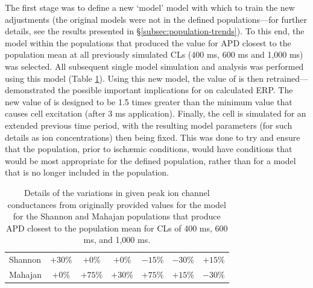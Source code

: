\documentclass[../thesis-main.tex]{subfiles}
\begin{document}
The first stage was to define a new `model' model with which to train the new adjustments (the original models were not in the defined populations---for further details, see the results presented in \S\ref{subsec:population-trends}). To this end, the model within the populations that produced the value for APD closest to the population mean at all previously simulated CLs (400 ms, 600 ms and 1,000 ms) was selected. All subsequent single model simulation and analysis was performed using this model (Table \ref{table:isch-model}). Using this new model, the value of \istim{} is then retrained---\citet{Sutton2000} demonstrated the possible important implications for \istim{} on calculated ERP. The new value of \istim{} is designed to be 1.5 times greater than the minimum value that causes cell excitation (after 3 ms application). Finally, the cell is simulated for an extended previous time period, with the resulting model parameters (for such details as ion concentrations) then being fixed. This was done to try and ensure that the population, prior to isch\ae{}mic conditions, would have conditions that would be most appropriate for the defined population, rather than for a model that is no longer included in the population.
\begin{table}
 \centering
 \begin{tabular}{lcccccc}
		& \gto{}	& \gca{}	& \gkr{}	& \gks{}	& \gkix{}	& \gnak{} \\
  \hline
  Shannon	& $+30\%$	& $+0\%$	& $+0\%$	& $-15\%$	& $-30\%$	& $+15\%$ \\
  Mahajan	& $+0\%$	& $+75\%$	& $+30\%$	& $+75\%$	& $+15\%$	& $-30\%$ \\
 \end{tabular}
 \caption[Models used to train isch\ae{}mia conditions]{Details of the variations in given peak ion channel conductances from originally provided values for the model for the Shannon and Mahajan populations that produce APD closest to the population mean for CLs of 400 ms, 600 ms, and 1,000 ms.}
 \label{table:isch-model}
\end{table}
\end{document}
